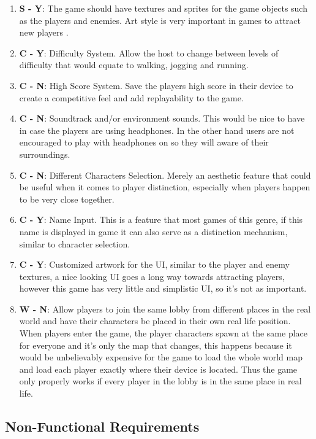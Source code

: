 \documentclass{dissertation}
\begin{document}
\begin{enumerate}
\item \textbf{S - Y}: The game should have textures and sprites for the game objects such as the players and enemies. Art style is very important in games to attract new players \citep{Solarski13}.
\item \textbf{C - Y}: Difficulty System. Allow the host to change between levels of difficulty that would equate to walking, jogging and running.
\item \textbf{C - N}: High Score System. Save the players high score in their device to create a competitive feel and add replayability to the game.
\item \textbf{C - N}: Soundtrack and/or environment sounds. This would be nice to have in case the players are using headphones. In the other hand users are not encouraged to play 
with headphones on so they will aware of their surroundings.
\item \textbf{C - N}: Different Characters Selection. Merely an aesthetic feature that could be useful when it comes to player distinction, especially when players happen to be very close together.
\item \textbf{C - Y}: Name Input. This is a feature that most games of this genre, if this name is displayed in game it can also serve as a distinction mechanism, similar to character 
selection.
\item \textbf{C - Y}: Customized artwork for the UI, similar to the player and enemy textures, a nice looking UI goes a long way towards attracting players, however this game has very little 
and simplistic UI, so it's not as important.
\item \textbf{W - N}: Allow players to join the same lobby from different places in the real world and have their characters be placed in their own real life position. When players enter the game, the player characters spawn at the same place for everyone and it's only the map that changes, this happens because it would be unbelievably expensive for the game to load the whole world map and load each player exactly where their device is located. Thus the game only properly works if every player in the lobby is in the same place in real life.
\end{enumerate}

\subsection{Non-Functional Requirements}
\end{document}
